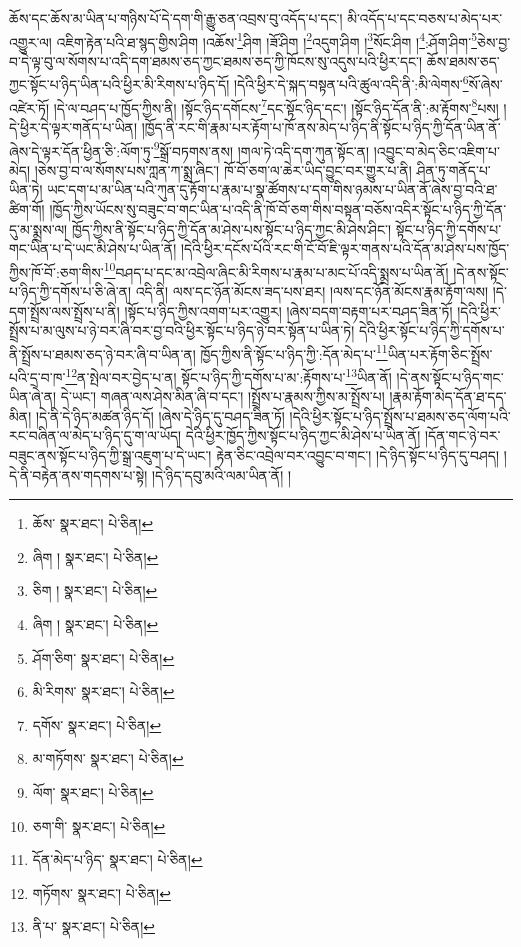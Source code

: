 ཆོས་དང་ཆོས་མ་ཡིན་པ་གཉིས་པོ་དེ་དག་གི་རྒྱུ་ཅན་འབྲས་བུ་འདོད་པ་དང་། མི་འདོད་པ་དང་བཅས་པ་མེད་པར་འགྱུར་ལ། འཇིག་རྟེན་པའི་ཐ་སྙད་གྱིས་ཤིག །འཆོས་\footnote{ཆོས་  སྣར་ཐང་།  པེ་ཅིན། }ཤིག །ཟོ་ཤིག །\footnote{ཞིག །  སྣར་ཐང་།  པེ་ཅིན། }འདུག་ཤིག །\footnote{ཅིག །  སྣར་ཐང་།  པེ་ཅིན། }སོང་ཤིག །\footnote{ཞིག །  སྣར་ཐང་།  པེ་ཅིན། }:ཤོག་ཤིག་\footnote{ཤོག་ཅིག་  སྣར་ཐང་།  པེ་ཅིན། }ཅེས་བྱ་བ་དེ་ལྟ་བུ་ལ་སོགས་པ་འདི་དག་ཐམས་ཅད་ཀྱང་ཐམས་ཅད་ཀྱི་ཁོངས་སུ་འདུས་པའི་ཕྱིར་དང་། ཆོས་ཐམས་ཅད་ཀྱང་སྟོང་པ་ཉིད་ཡིན་པའི་ཕྱིར་མི་རིགས་པ་ཉིད་དོ། །དེའི་ཕྱིར་དེ་སྐད་བསྟན་པའི་ཚུལ་འདི་ནི་:མི་ལེགས་\footnote{མི་རིགས་  སྣར་ཐང་།  པེ་ཅིན། }སོ་ཞེས་འཛེར་ཏོ། །དེ་ལ་བཤད་པ་ཁྱོད་ཀྱིས་ནི། །སྟོང་ཉིད་དགོངས་\footnote{དགོས་  སྣར་ཐང་།  པེ་ཅིན། }དང་སྟོང་ཉིད་དང་། །སྟོང་ཉིད་དོན་ནི་:མ་རྟོགས་\footnote{མ་གཏོགས་  སྣར་ཐང་།  པེ་ཅིན། }པས། །དེ་ཕྱིར་དེ་ལྟར་གནོད་པ་ཡིན། །ཁྱོད་ནི་རང་གི་རྣམ་པར་རྟོག་པ་ཁོ་ནས་མེད་པ་ཉིད་ནི་སྟོང་པ་ཉིད་ཀྱི་དོན་ཡིན་ནོ་ཞེས་དེ་ལྟར་དོན་ཕྱིན་ཅི་:ལོག་ཏུ་\footnote{ལོག་  སྣར་ཐང་།  པེ་ཅིན། }སྒྲོ་བཏགས་ནས། །གལ་ཏེ་འདི་དག་ཀུན་སྟོང་ན། །འབྱུང་བ་མེད་ཅིང་འཇིག་པ་མེད། །ཅེས་བྱ་བ་ལ་སོགས་པས་ཀླན་ཀ་སྨྲ་ཞིང་། ཁོ་བོ་ཅག་ལ་ཆེར་ཡིད་བྱུང་བར་གྱུར་པ་ནི། ཤིན་ཏུ་གནོད་པ་ཡིན་ཏེ། ཡང་དག་པ་མ་ཡིན་པའི་ཀུན་དུ་རྟོག་པ་རྣམ་པ་སྣ་ཚོགས་པ་དག་གིས་ཉམས་པ་ཡིན་ནོ་ཞེས་བྱ་བའི་ཐ་ཚིག་གོ། །ཁྱོད་ཀྱིས་ཡོངས་སུ་བཟུང་བ་གང་ཡིན་པ་འདི་ནི་ཁོ་བོ་ཅག་གིས་བསྟན་བཅོས་འདིར་སྟོང་པ་ཉིད་ཀྱི་དོན་དུ་མ་སྨྲས་ལ། ཁྱོད་ཀྱིས་ནི་སྟོང་པ་ཉིད་ཀྱི་དོན་མ་ཤེས་པས་སྟོང་པ་ཉིད་ཀྱང་མི་ཤེས་ཤིང་། སྟོང་པ་ཉིད་ཀྱི་དགོས་པ་གང་ཡིན་པ་དེ་ཡང་མི་ཤེས་པ་ཡིན་ནོ། །དེའི་ཕྱིར་དངོས་པོའི་རང་གི་ངོ་བོ་ཇི་ལྟར་གནས་པའི་དོན་མ་ཤེས་པས་ཁྱོད་ཀྱིས་ཁོ་བོ་:ཅག་གིས་\footnote{ཅག་གི་  སྣར་ཐང་།  པེ་ཅིན། }བཤད་པ་དང་མ་འབྲེལ་ཞིང་མི་རིགས་པ་རྣམ་པ་མང་པོ་འདི་སྨྲས་པ་ཡིན་ནོ། །དེ་ནས་སྟོང་པ་ཉིད་ཀྱི་དགོས་པ་ཅི་ཞེ་ན། འདི་ནི། ལས་དང་ཉོན་མོངས་ཟད་པས་ཐར། །ལས་དང་ཉོན་མོངས་རྣམ་རྟོག་ལས། །དེ་དག་སྤྲོས་ལས་སྤྲོས་པ་ནི། །སྟོང་པ་ཉིད་ཀྱིས་འགག་པར་འགྱུར། །ཞེས་བདག་བརྟག་པར་བཤད་ཟིན་ཏོ། །དེའི་ཕྱིར་སྤྲོས་པ་མ་ལུས་པ་ཉེ་བར་ཞི་བར་བྱ་བའི་ཕྱིར་སྟོང་པ་ཉིད་ཉེ་བར་སྟོན་པ་ཡིན་ཏེ། དེའི་ཕྱིར་སྟོང་པ་ཉིད་ཀྱི་དགོས་པ་ནི་སྤྲོས་པ་ཐམས་ཅད་ཉེ་བར་ཞི་བ་ཡིན་ན། ཁྱོད་ཀྱིས་ནི་སྟོང་པ་ཉིད་ཀྱི་:དོན་མེད་པ་\footnote{དོན་མེད་པ་ཉིད་  སྣར་ཐང་།  པེ་ཅིན། }ཡིན་པར་རྟོག་ཅིང་སྤྲོས་པའི་དྲ་བ་ཁ་\footnote{གཏོགས་  སྣར་ཐང་།  པེ་ཅིན། }ན་སྤེལ་བར་བྱེད་པ་ན། སྟོང་པ་ཉིད་ཀྱི་དགོས་པ་མ་:རྟོགས་པ་\footnote{ནི་པ་  སྣར་ཐང་།  པེ་ཅིན། }ཡིན་ནོ། །དེ་ནས་སྟོང་པ་ཉིད་གང་ཡིན་ཞེ་ན། དེ་ཡང་། གཞན་ལས་ཤེས་མིན་ཞི་བ་དང་། །སྤྲོས་པ་རྣམས་ཀྱིས་མ་སྤྲོས་པ། །རྣམ་རྟོག་མེད་དོན་ཐ་དད་མིན། །དེ་ནི་དེ་ཉིད་མཚན་ཉིད་དོ། །ཞེས་དེ་ཉིད་དུ་བཤད་ཟིན་ཏོ། །དེའི་ཕྱིར་སྟོང་པ་ཉིད་སྤྲོས་པ་ཐམས་ཅད་ལོག་པའི་རང་བཞིན་ལ་མེད་པ་ཉིད་དུ་ག་ལ་ཡོད། དེའི་ཕྱིར་ཁྱོད་ཀྱིས་སྟོང་པ་ཉིད་ཀྱང་མི་ཤེས་པ་ཡིན་ནོ། །དོན་གང་ཉེ་བར་བཟུང་ནས་སྟོང་པ་ཉིད་ཀྱི་སྒྲ་འཇུག་པ་དེ་ཡང་། རྟེན་ཅིང་འབྲེལ་བར་འབྱུང་བ་གང་། །དེ་ཉིད་སྟོང་པ་ཉིད་དུ་བཤད། །དེ་ནི་བརྟེན་ནས་གདགས་པ་སྟེ། །དེ་ཉིད་དབུ་མའི་ལམ་ཡིན་ནོ། །
